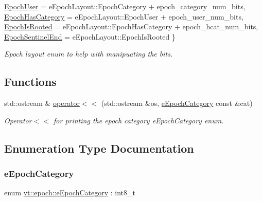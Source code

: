 \begin{DoxyCompactItemize}
\hyperlink{namespacevt_1_1epoch_a327a45834b567f1268737d5e10b05f9da9319a32437ae6e2b3fbd7d45ad8de721}{Epoch\+User} = e\+Epoch\+Layout\+:\+:Epoch\+Category + epoch\+\_\+category\+\_\+num\+\_\+bits, 
\newline
\hyperlink{namespacevt_1_1epoch_a327a45834b567f1268737d5e10b05f9dabcd935e88fb4e0eb6e87bf1aeefc9391}{Epoch\+Has\+Category} = e\+Epoch\+Layout\+:\+:Epoch\+User + epoch\+\_\+user\+\_\+num\+\_\+bits, 
\hyperlink{namespacevt_1_1epoch_a327a45834b567f1268737d5e10b05f9da436a46ce6e3fbea5f62e1c6ef4ef6704}{Epoch\+Is\+Rooted} = e\+Epoch\+Layout\+:\+:Epoch\+Has\+Category + epoch\+\_\+hcat\+\_\+num\+\_\+bits, 
\hyperlink{namespacevt_1_1epoch_a327a45834b567f1268737d5e10b05f9da1715fdc206433ce2885bbe12d0dc9628}{Epoch\+Sentinel\+End} = e\+Epoch\+Layout\+:\+:Epoch\+Is\+Rooted
 \}\begin{DoxyCompactList}\small\item\em Epoch layout enum to help with manipuating the bits. \end{DoxyCompactList}
\end{DoxyCompactItemize}
\subsection*{Functions}
\begin{DoxyCompactItemize}
\item 
std\+::ostream \& \hyperlink{namespacevt_1_1epoch_ac6e7a477d5b11270b5b1e6f7a70e3bd5}{operator$<$$<$} (std\+::ostream \&os, \hyperlink{namespacevt_1_1epoch_a956abe0aceef0d10a988de8acb002c7c}{e\+Epoch\+Category} const \&cat)
\begin{DoxyCompactList}\small\item\em Operator$<$$<$ for printing the epoch category {\ttfamily e\+Epoch\+Category} enum. \end{DoxyCompactList}\end{DoxyCompactItemize}


\subsection{Enumeration Type Documentation}
\mbox{\label{namespacevt_1_1epoch_a956abe0aceef0d10a988de8acb002c7c}} 
\subsubsection{\texorpdfstring{e\+Epoch\+Category}{eEpochCategory}}
{\footnotesize\ttfamily enum \hyperlink{namespacevt_1_1epoch_a956abe0aceef0d10a988de8acb002c7c}{vt\+::epoch\+::e\+Epoch\+Category} \+: int8\+\_\+t\hspace{0.3cm}{\ttfamily [strong]}}



